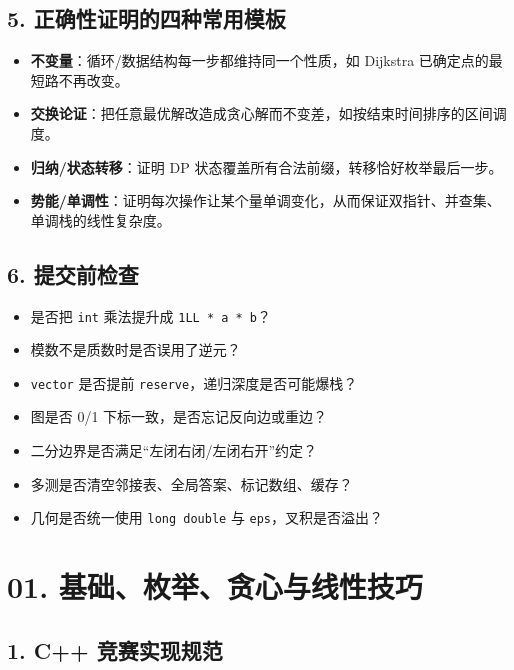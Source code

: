 \section{5. 正确性证明的四种常用模板}\label{ux6b63ux786eux6027ux8bc1ux660eux7684ux56dbux79cdux5e38ux7528ux6a21ux677f}

\begin{itemize}
\tightlist
\item
  \textbf{不变量}：循环/数据结构每一步都维持同一个性质，如 Dijkstra 已确定点的最短路不再改变。
\item
  \textbf{交换论证}：把任意最优解改造成贪心解而不变差，如按结束时间排序的区间调度。
\item
  \textbf{归纳/状态转移}：证明 DP 状态覆盖所有合法前缀，转移恰好枚举最后一步。
\item
  \textbf{势能/单调性}：证明每次操作让某个量单调变化，从而保证双指针、并查集、单调栈的线性复杂度。
\end{itemize}

\section{6. 提交前检查}\label{ux63d0ux4ea4ux524dux68c0ux67e5}

\begin{itemize}
\tightlist
\item
  是否把 \passthrough{\lstinline!int!} 乘法提升成 \passthrough{\lstinline!1LL * a * b!}？
\item
  模数不是质数时是否误用了逆元？
\item
  \passthrough{\lstinline!vector!} 是否提前 \passthrough{\lstinline!reserve!}，递归深度是否可能爆栈？
\item
  图是否 0/1 下标一致，是否忘记反向边或重边？
\item
  二分边界是否满足``左闭右闭/左闭右开''约定？
\item
  多测是否清空邻接表、全局答案、标记数组、缓存？
\item
  几何是否统一使用 \passthrough{\lstinline!long double!} 与 \passthrough{\lstinline!eps!}，叉积是否溢出？
\end{itemize}

\chapter{01. 基础、枚举、贪心与线性技巧}\label{ux57faux7840ux679aux4e3eux8d2aux5fc3ux4e0eux7ebfux6027ux6280ux5de7}

\section{1. C++ 竞赛实现规范}\label{c-ux7adeux8d5bux5b9eux73b0ux89c4ux8303}

